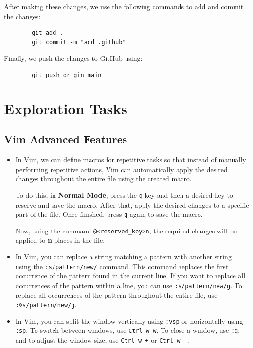 \documentclass{article}
\begin{document}
        After making these changes, we use the following commands to add and commit the changes:
        \begin{verbatim}
        git add .
        git commit -m "add .github"
        \end{verbatim}
        Finally, we push the changes to GitHub using:
        \begin{verbatim}
        git push origin main
        \end{verbatim}


\section{Exploration Tasks}

    \subsection{Vim Advanced Features}
        \begin{itemize}
            \item 
            In Vim, we can define macros for repetitive tasks so that instead of manually performing repetitive actions, Vim can automatically apply the desired changes throughout the entire file using the created macro. 
    
            To do this, in \textbf{Normal Mode}, press the \texttt{q} key and then a desired key to reserve and save the macro. After that, apply the desired changes to a specific part of the file. Once finished, press \texttt{q} again to save the macro. 
    
            Now, using the command \texttt{@<reserved\_key>n}, the required changes will be applied to \textbf{n} places in the file.

            
            \item 
            In Vim, you can replace a string matching a pattern with another string using the \texttt{:s/pattern/new/} command. This command replaces the first occurrence of the pattern found in the current line. If you want to replace all occurrences of the pattern within a line, you can use \texttt{:s/pattern/new/g}. To replace all occurrences of the pattern throughout the entire file, use \texttt{:\%s/pattern/new/g}.

            \item 
            In Vim, you can split the window vertically using \texttt{:vsp} or horizontally using \texttt{:sp}. To switch between windows, use \texttt{Ctrl-w w}. To close a window, use \texttt{:q}, and to adjust the window size, use \texttt{Ctrl-w +} or \texttt{Ctrl-w -}.

        \end{itemize} 
\end{document}
